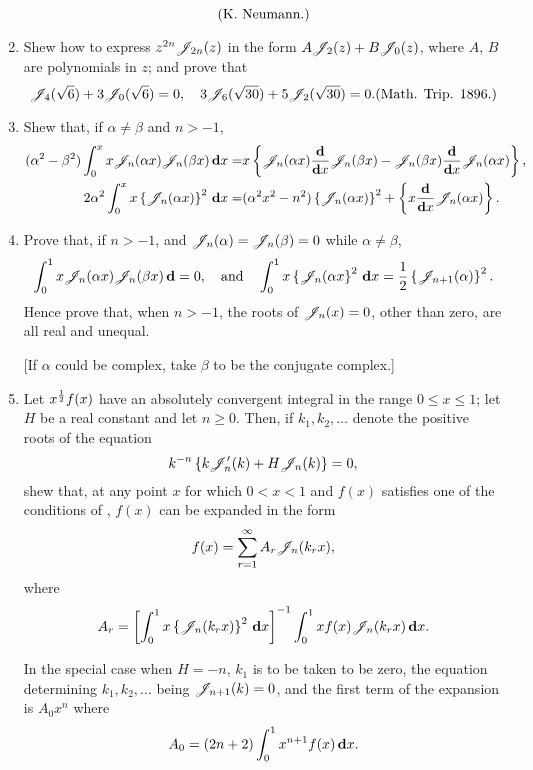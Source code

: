 \documentclass{book}
\begin{document}
\begin{enumerate}
$$  \addexamplecitation{K. Neumann.}
  $$
\item
  Shew how to express $z^{2n} \mathscr{J}_{2n}(z)$ in the form
  $A \mathscr{J}_{2}(z) + B \mathscr{J}_{0}(z)$, where $A$, $B$ are polynomials in
  $z$; and prove that
  $$
  \besJ_{4}(\sqrt{6}) + 3 \besJ_{0}(\sqrt{6}) = 0,
  \quad
  3 \besJ_{6}(\sqrt{30}) + 5 \besJ_{2}(\sqrt{30}) = 0.
  \addexamplecitation{Math. Trip. 1896.}
  $$
\item
  Shew that, if $\alpha \neq \beta$ and $n > -1$,
  \begin{align*}
    (\alpha^{2}-\beta^{2})
    \int_{0}^{x} x \mathscr{J}_{n}(\alpha x) \mathscr{J}_{n}(\beta x) \, \mathbf{d} x
    =&
    x \left\{ 
      \mathscr{J}_{n}(\alpha x) \frac{\mathbf{d}}{\mathbf{d} x} \mathscr{J}_{n}(\beta x)
      - \mathscr{J}_{n}(\beta x) \frac{\mathbf{d}}{\mathbf{d} x} \mathscr{J}_{n}(\alpha x)
     \right\},
    \\
    2 \alpha^{2}
    \int_{0}^{x}
    x \left\{  \mathscr{J}_{n}(\alpha x)  \right\}^{2} \, \mathbf{d} x
    =&
    (\alpha^{2} x^{2} - n^{2})
    \left\{  \mathscr{J}_{n}(\alpha x)  \right\}^{2}
    +
    \left\{ 
      x \frac{\mathbf{d}}{\mathbf{d} x} \mathscr{J}_{n}(\alpha x)
     \right\}.
  \end{align*}
\item
  Prove that, if $n > -1$, and $\mathscr{J}_{n}(\alpha) = \mathscr{J}_{n}(\beta) =
  0$ while $\alpha \neq \beta$,
  $$
  \int_{0}^{1} x \mathscr{J}_{n}(\alpha x) \mathscr{J}_{n}(\beta x) \, \mathbf{d} = 0,
  \quad
  \textrm{and}
  \quad
  \int_{0}^{1} x \left\{ \mathscr{J}_{n}(\alpha x \right\}^{2} \, \mathbf{d} x
  =
  \frac{1}{2} \left\{  \mathscr{J}_{n+1}(\alpha) \right\}^{2}.
  $$
  Hence prove that, when $n > -1$, the roots of $\mathscr{J}_{n}(x)=0$, other
  than zero, are all real and unequal.

  [If $\alpha$ could be complex, take $\beta$ to be the conjugate
  complex.]
\item
  Let $x^{\frac{1}{2}} f(x)$ have an absolutely convergent integral in the
  range $0 \leq x \leq 1$; let $H$ be a real constant and let $n \geq
  0$. Then, if $k_{1}, k_{2}, \ldots$ denote the positive roots of
  the equation
  $$
  k^{-n}
  \left\{  k \mathscr{J}'_{n}(k) + H \mathscr{J}_{n}(k) \right\}
  =
  0,
  $$
  shew that, at any point $x$ for which $0 < x < 1$ and $f(x)$
  satisfies one of the conditions of ,
  $f(x)$ can be expanded in the form
  $$
  f(x) = \sum_{r=1}^{\infty} A_{r} \mathscr{J}_{n}(k_{r} x),
  $$
  where
  $$
  A_{r}
  =
  \left[  \int_{0}^{1} x \left\{ \mathscr{J}_{n}(k_{r}x) \right\}^{2} \, \mathbf{d} x \right]^{-1}
  \int_{0}^{1} x f(x) \mathscr{J}_{n}(k_{r}x) \, \mathbf{d} x.
  $$

  In the special case when $H = -n$, $k_{1}$ is to be taken to be
  zero, the equation determining $k_{1}, k_{2}, \ldots$ being
  $\mathscr{J}_{n+1}(k) = 0$, and the first term of the expansion is $A_{0}
  x^{n}$ where
  $$
  A_{0} = (2n+2) \int_{0}^{1} x^{n+1} f(x) \, \mathbf{d} x.
  $$


\end{enumerate}
\end{document}
